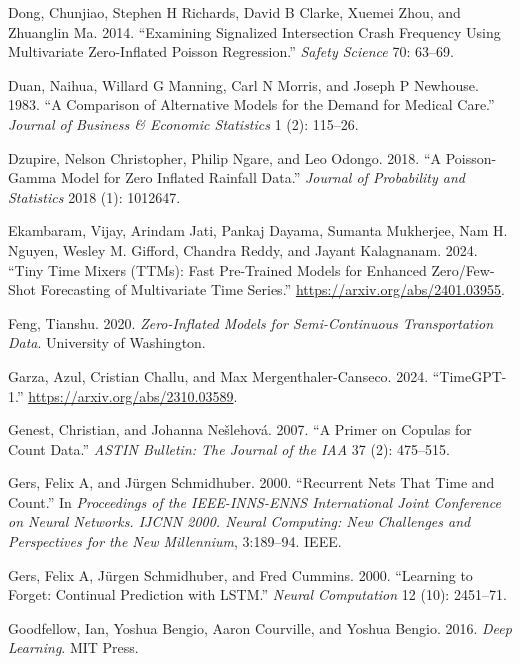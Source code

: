 \documentclass[
  letterpaper,
  double,
  12pt,
  1.0in]{beavtex}
\newlength{\cslhangindent}
\newenvironment{CSLReferences}[2] %
 {\begin{list}{}{%
  \setlength{\itemindent}{0pt}
  \setlength{\leftmargin}{0pt}
  \setlength{\parsep}{0pt}
  \ifodd #1
   \setlength{\leftmargin}{\cslhangindent}
   \setlength{\itemindent}{-1\cslhangindent}
  \fi
  \setlength{\itemsep}{#2\baselineskip}}}
 {\end{list}}
\begin{document}
\begin{CSLReferences}{1}{0}
Dong, Chunjiao, Stephen H Richards, David B Clarke, Xuemei Zhou, and
Zhuanglin Ma. 2014. {``Examining Signalized Intersection Crash Frequency
Using Multivariate Zero-Inflated Poisson Regression.''} \emph{Safety
Science} 70: 63--69.

Duan, Naihua, Willard G Manning, Carl N Morris, and Joseph P Newhouse.
1983. {``A Comparison of Alternative Models for the Demand for Medical
Care.''} \emph{Journal of Business \& Economic Statistics} 1 (2):
115--26.

Dzupire, Nelson Christopher, Philip Ngare, and Leo Odongo. 2018. {``A
Poisson-Gamma Model for Zero Inflated Rainfall Data.''} \emph{Journal of
Probability and Statistics} 2018 (1): 1012647.

Ekambaram, Vijay, Arindam Jati, Pankaj Dayama, Sumanta Mukherjee, Nam H.
Nguyen, Wesley M. Gifford, Chandra Reddy, and Jayant Kalagnanam. 2024.
{``Tiny Time Mixers (TTMs): Fast Pre-Trained Models for Enhanced
Zero/Few-Shot Forecasting of Multivariate Time Series.''}
\url{https://arxiv.org/abs/2401.03955}.

Feng, Tianshu. 2020. \emph{Zero-Inflated Models for Semi-Continuous
Transportation Data}. University of Washington.

Garza, Azul, Cristian Challu, and Max Mergenthaler-Canseco. 2024.
{``TimeGPT-1.''} \url{https://arxiv.org/abs/2310.03589}.

Genest, Christian, and Johanna Nešlehová. 2007. {``A Primer on Copulas
for Count Data.''} \emph{ASTIN Bulletin: The Journal of the IAA} 37 (2):
475--515.

Gers, Felix A, and Jürgen Schmidhuber. 2000. {``Recurrent Nets That Time
and Count.''} In \emph{Proceedings of the IEEE-INNS-ENNS International
Joint Conference on Neural Networks. IJCNN 2000. Neural Computing: New
Challenges and Perspectives for the New Millennium}, 3:189--94. IEEE.

Gers, Felix A, Jürgen Schmidhuber, and Fred Cummins. 2000. {``Learning
to Forget: Continual Prediction with LSTM.''} \emph{Neural Computation}
12 (10): 2451--71.

Goodfellow, Ian, Yoshua Bengio, Aaron Courville, and Yoshua Bengio.
2016. \emph{Deep Learning}. MIT Press.


\end{CSLReferences}
\end{document}
